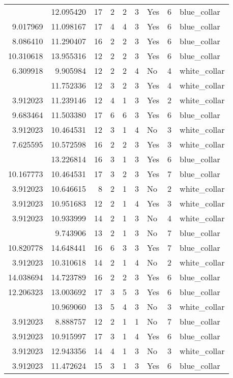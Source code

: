 \documentclass[
]{article}
\begin{document}
\begin{longtable}[t]{rrrrrllrl}
\addlinespace
7.346010 & 12.095420 & 17 & 2 & 2 & 3 & Yes & 6 & blue\_collar\\
9.017969 & 11.098167 & 17 & 4 & 4 & 3 & Yes & 6 & blue\_collar\\
8.086410 & 11.290407 & 16 & 2 & 2 & 3 & Yes & 6 & blue\_collar\\
10.310618 & 13.955316 & 12 & 2 & 2 & 3 & Yes & 6 & blue\_collar\\
6.309918 & 9.905984 & 12 & 2 & 2 & 4 & No & 4 & white\_collar\\
\addlinespace
9.215328 & 11.752336 & 12 & 3 & 2 & 3 & Yes & 4 & white\_collar\\
3.912023 & 11.239146 & 12 & 4 & 1 & 3 & Yes & 2 & white\_collar\\
9.683464 & 11.503380 & 17 & 6 & 6 & 3 & Yes & 6 & blue\_collar\\
3.912023 & 10.464531 & 12 & 3 & 1 & 4 & No & 3 & white\_collar\\
7.625595 & 10.572598 & 16 & 2 & 2 & 3 & Yes & 3 & white\_collar\\
\addlinespace
3.912023 & 13.226814 & 16 & 3 & 1 & 3 & Yes & 6 & blue\_collar\\
10.167773 & 10.464531 & 17 & 3 & 2 & 3 & Yes & 7 & blue\_collar\\
3.912023 & 10.646615 & 8 & 2 & 1 & 3 & No & 2 & white\_collar\\
3.912023 & 10.951683 & 12 & 2 & 1 & 4 & Yes & 3 & white\_collar\\
3.912023 & 10.933999 & 14 & 2 & 1 & 3 & No & 4 & white\_collar\\
\addlinespace
3.912023 & 9.743906 & 13 & 2 & 1 & 3 & No & 7 & blue\_collar\\
10.820778 & 14.648441 & 16 & 6 & 3 & 3 & Yes & 7 & blue\_collar\\
3.912023 & 10.310618 & 14 & 2 & 1 & 4 & No & 2 & white\_collar\\
14.038694 & 14.723789 & 16 & 2 & 2 & 3 & Yes & 6 & blue\_collar\\
12.206323 & 13.003692 & 17 & 3 & 5 & 3 & Yes & 6 & blue\_collar\\
\addlinespace
7.408531 & 10.969060 & 13 & 5 & 4 & 3 & No & 3 & white\_collar\\
3.912023 & 8.888757 & 12 & 2 & 1 & 1 & No & 7 & blue\_collar\\
3.912023 & 10.915997 & 17 & 3 & 1 & 4 & Yes & 6 & blue\_collar\\
3.912023 & 12.943356 & 14 & 4 & 1 & 3 & No & 3 & white\_collar\\
3.912023 & 11.472624 & 15 & 3 & 1 & 3 & Yes & 6 & blue\_collar\\

\end{longtable}
\end{document}
